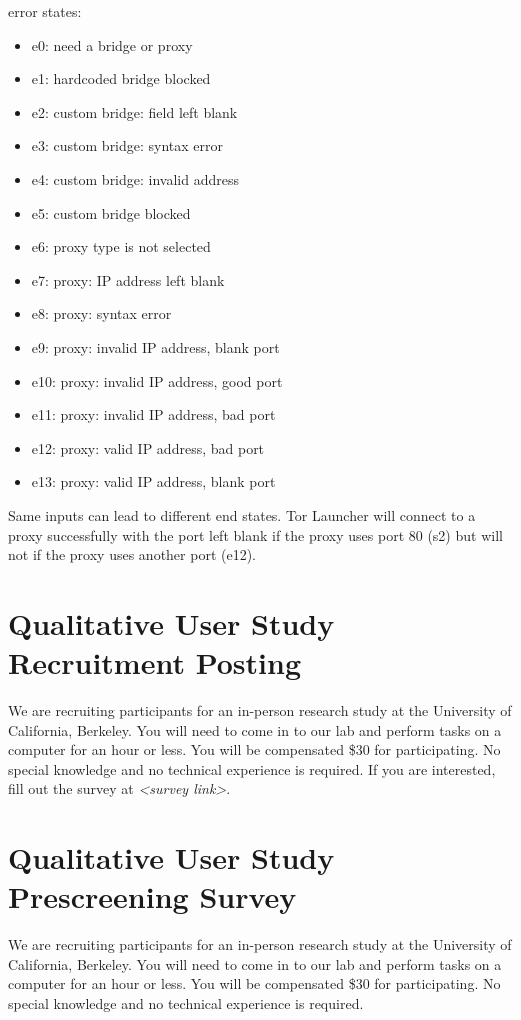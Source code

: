 \documentclass[USenglish,oneside,twocolumn]{article}
\begin{document}
error states:
\begin{itemize} 
\item e0: need a bridge or proxy
\item e1: hardcoded bridge blocked
\item e2: custom bridge: field left blank
\item e3: custom bridge: syntax error
\item e4: custom bridge: invalid address
\item e5: custom bridge blocked
\item e6: proxy type is not selected
\item e7: proxy: IP address left blank
\item e8: proxy: syntax error
\item e9: proxy: invalid IP address, blank port
\item e10: proxy: invalid IP address, good port
\item e11: proxy: invalid IP address, bad port
\item e12: proxy: valid IP address, bad port
\item e13: proxy: valid IP address, blank port
\end{itemize} 

Same inputs can lead to different end states. Tor Launcher will connect to a proxy successfully with the port left blank if the proxy uses port 80 (s2) but will not if the proxy uses another port (e12). 

\section{Qualitative User Study Recruitment Posting} 
\label{qualitative-recruitment}
We are recruiting participants for an in-person research study at the University of California, Berkeley. 
You will need to come in to our lab and perform tasks on a computer for an hour or less. You will be compensated \$30 for participating. 
No special knowledge and no technical experience is required. If you are interested, fill out the survey at \textit{<survey link>}. 

\section{Qualitative User Study Prescreening Survey} 
\label{qualitative-prescreening}
We are recruiting participants for an in-person research study at the University of California, Berkeley. 
You will need to come in to our lab and perform tasks on a computer for an hour or less. You will be compensated \$30 for participating. No special knowledge and no technical experience is required.\\
\end{document}
